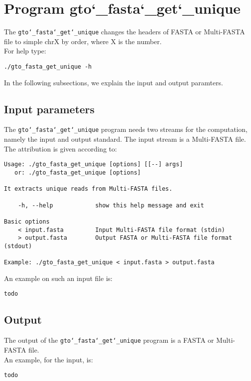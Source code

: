 \section{Program gto\char`_fasta\char`_get\char`_unique}
The \texttt{gto\char`_fasta\char`_get\char`_unique} changes the headers of FASTA or Multi-FASTA file to simple chrX by order, where X is the number.\\
For help type:
\begin{lstlisting}
./gto_fasta_get_unique -h
\end{lstlisting}
In the following subsections, we explain the input and output paramters.

\subsection*{Input parameters}

The \texttt{gto\char`_fasta\char`_get\char`_unique} program needs two streams for the computation,
namely the input and output standard. The input stream is a Multi-FASTA file.\\
The attribution is given according to:
\begin{lstlisting}
Usage: ./gto_fasta_get_unique [options] [[--] args]
   or: ./gto_fasta_get_unique [options]

It extracts unique reads from Multi-FASTA files.

    -h, --help            show this help message and exit

Basic options
    < input.fasta         Input Multi-FASTA file format (stdin)
    > output.fasta        Output FASTA or Multi-FASTA file format (stdout)

Example: ./gto_fasta_get_unique < input.fasta > output.fasta
\end{lstlisting}
An example on such an input file is:
\begin{lstlisting}
todo
\end{lstlisting}

\subsection*{Output}
The output of the \texttt{gto\char`_fasta\char`_get\char`_unique} program is a FASTA or Multi-FASTA file.\\
An example, for the input, is:
\begin{lstlisting}
todo
\end{lstlisting}
